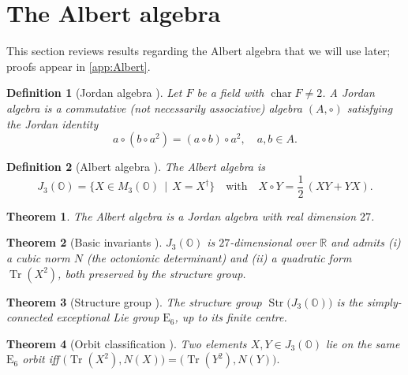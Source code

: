 \documentclass[pdflatex,sn-mathphys-num]{sn-jnl}
\theoremstyle{thmstyleone}
\newtheorem{theorem}{Theorem}
\theoremstyle{thmstyletwo}%
\theoremstyle{thmstylethree}%
\newtheorem{definition}{Definition}%
\newcommand{\E}[1]{\mathrm{E_{#1}}}
\newcommand{\ESix}{\E{6}}
\begin{document}
\section{The Albert algebra}
\label{sec:Albert}
This section reviews results regarding the Albert algebra that we will use later; proofs appear in
\autoref{app:Albert}.

\begin{definition}[Jordan algebra \cite{Jacobson:1968}]
Let $F$ be a field with $\operatorname{char}F\neq 2$.
A \emph{Jordan algebra} is a commutative (not necessarily associative)
algebra $(A,\circ)$ satisfying the \emph{Jordan identity}
\[
  a\circ(b\circ a^{2}) = (a\circ b)\circ a^{2},
  \quad
  a,b\in A.
\]
\end{definition}

\begin{definition}[Albert algebra
  \cite{Albert:1934,McCrimmon:2004,Springer:2000}]
The \emph{Albert algebra} is
\[
  J_{3}(\mathbb O)
    = \bigl\{X\in M_{3}(\mathbb O) \,\mid\, X = X^{\dagger}\bigr\}
    \quad\text{with}\quad
  X\circ Y = \frac12\,(XY + YX).
\]
\end{definition}

\begin{theorem}\label{thm:Albert}
    The Albert algebra is a Jordan algebra with real dimension $27$.
\end{theorem}

\begin{theorem}[Basic invariants
   \cite{Albert:1934,McCrimmon:2004}]
\label{thm:AlbertForms}
$J_{3}(\mathbb O)$ is $27$-dimensional over $\mathbb R$ and admits  
(i) a cubic norm $N$ (the octonionic determinant)  
and (ii) a quadratic form $\operatorname{Tr}(X^{2})$,  
both preserved by the structure group.
\end{theorem}

\begin{theorem}[Structure group
   \cite{Albert:1934,Jacobson:1968,Springer:2000}]
\label{thm:StructureGroup}
The structure group
\(
  \operatorname{Str}\bigl(J_{3}(\mathbb O)\bigr)
\)
is the simply-connected exceptional Lie group $\ESix$, up to its finite
centre.
\end{theorem}

\begin{theorem}[Orbit classification
   \cite{Springer:2000,McCrimmon:2004}]
\label{thm:OrbitClass}
Two elements $X,Y\in J_{3}(\mathbb O)$ lie on the same $\ESix$ orbit  
iff
\(
  \bigl(\operatorname{Tr}(X^{2}),N(X)\bigr)
   =\bigl(\operatorname{Tr}(Y^{2}),N(Y)\bigr).
\)
\end{theorem}
\end{document}

